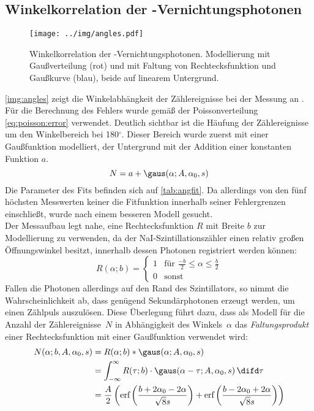\subsection{Winkelkorrelation der -Vernichtungsphotonen}
\begin{figure}[H]
\begin{center}
  \texttt{[image: ../img/angles.pdf]}
  \caption{Winkelkorrelation der \na-Vernichtungsphotonen.
  Modellierung mit Gaußverteilung (rot) und
  mit Faltung von Rechtecksfunktion und Gaußkurve (blau), beide auf linearem Untergrund.}
  \label{img:angles}
\end{center}
\end{figure}

\autoref{img:angles} zeigt die Winkelabhängkeit der Zählereignisse bei der Messung an \na.
Für die Berechnung des Fehlers wurde gemäß der Poissonverteilung \autoref{eq:poisson:error} verwendet.
Deutlich sichtbar ist die Häufung der Zählereignisse um den Winkelbereich bei 180$^\circ$.
Dieser Bereich wurde zuerst mit einer Gaußfunktion modelliert,
der Untergrund mit der Addition einer konstanten Funktion $a$.
\begin{equation}
  N = a + \gaus(\alpha; A, \alpha_0, s)
\end{equation}
Die Parameter des Fits befinden sich auf \autoref{tab:angfit}.
Da allerdings von den fünf höchsten Messwerten keiner die Fitfunktion innerhalb seiner Fehlergrenzen einschließt,
wurde nach einem besseren Modell gesucht.\\
Der Messaufbau legt nahe, eine Rechtecksfunktion $R$ mit Breite $b$ zur Modellierung zu verwenden,
da der NaI-Szintillationszähler einen relativ großen Öffnungswinkel besitzt,
innerhalb dessen Photonen registriert werden können:
\begin{equation}
  R(\alpha;b) =
\begin{cases}
1 & \text{für }\frac{-b}{2} \leq \alpha \leq \frac{b}{2}\\
0 & \text{sonst}
\end{cases}
\end{equation}
Fallen die Photonen allerdings auf den Rand des Szintillators,
so nimmt die Wahrscheinlichkeit ab, dass genügend Sekundärphotonen erzeugt werden,
um einen Zählpuls auszulösen.
Diese Überlegung führt dazu, dass als Modell für die Anzahl der Zählereignisse~$N$
in Abhängigkeit des Winkels~$\alpha$
das \emph{Faltungsprodukt} einer Rechtecksfunktion mit einer
Gaußfunktion verwendet wird:
\begin{equation}
\begin{split}
  N(\alpha;b,A,\alpha_0,s)&=R(\alpha;b)*\gaus(\alpha;A,\alpha_0,s)\\
  & = \int_{-\infty}^{\infty}{R(\tau;b) \cdot  \gaus(\alpha-\tau;A,\alpha_0,s) \, \difd\tau}\\
  & =   \frac{A}{2} \left(\text{erf}\left(\frac{b+2 \alpha_0 -2 \alpha}{\sqrt{8} s }\right)+
  \text{erf}\left(\frac{b-2 \alpha_0 +2 \alpha}{\sqrt{8} s }\right)\right)
\end{split}
\end{equation}
